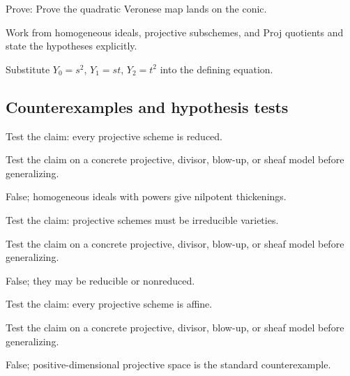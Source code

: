 \begin{exercise}\label{exr:vi37-expand-09}
Prove: Prove the quadratic Veronese map lands on the conic.
\end{exercise}
\begin{hint}
Work from homogeneous ideals, projective subschemes, and Proj quotients and state the hypotheses explicitly.
\end{hint}
\begin{solution}
Substitute $Y_0=s^2$, $Y_1=st$, $Y_2=t^2$ into the defining equation.
\end{solution}

\subsection*{Counterexamples and hypothesis tests}

\begin{exercise}\label{exr:vi37-expand-10}
Test the claim: every projective scheme is reduced.
\end{exercise}
\begin{hint}
Test the claim on a concrete projective, divisor, blow-up, or sheaf model before generalizing.
\end{hint}
\begin{solution}
False; homogeneous ideals with powers give nilpotent thickenings.
\end{solution}

\begin{exercise}\label{exr:vi37-expand-11}
Test the claim: projective schemes must be irreducible varieties.
\end{exercise}
\begin{hint}
Test the claim on a concrete projective, divisor, blow-up, or sheaf model before generalizing.
\end{hint}
\begin{solution}
False; they may be reducible or nonreduced.
\end{solution}

\begin{exercise}\label{exr:vi37-expand-12}
Test the claim: every projective scheme is affine.
\end{exercise}
\begin{hint}
Test the claim on a concrete projective, divisor, blow-up, or sheaf model before generalizing.
\end{hint}
\begin{solution}
False; positive-dimensional projective space is the standard counterexample.
\end{solution}

